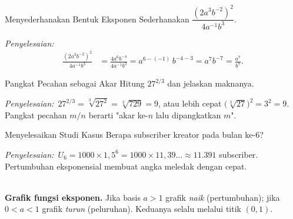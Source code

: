 \documentclass[11pt,a4paper]{report}
\theoremstyle{gaya}
\newcommand{\jawab}{\par\smallskip\noindent\textit{\textcolor{oranye}{Penyelesaian:}}\ }
\begin{document}
\begin{contoh}{Menyederhanakan Bentuk Eksponen}
Sederhanakan $\dfrac{(2a^3 b^{-2})^2}{4 a^{-1} b^3}$.

\jawab
\begin{align*}
\frac{(2a^3 b^{-2})^2}{4a^{-1}b^3}
&= \frac{4 a^6 b^{-4}}{4 a^{-1} b^3}
= a^{6-(-1)} \, b^{-4-3}
= a^{7} b^{-7} = \frac{a^7}{b^7}.
\end{align*}
\end{contoh}

\begin{contoh}{Pangkat Pecahan sebagai Akar}
Hitung $27^{2/3}$ dan jelaskan maknanya.

\jawab $27^{2/3}=\sqrt[3]{27^2}=\sqrt[3]{729}=9$, atau lebih cepat $\big(\sqrt[3]{27}\big)^2=3^2=9$. Pangkat pecahan $m/n$ berarti "akar ke-$n$ lalu dipangkatkan $m$".
\end{contoh}

\begin{contoh}{Menyelesaikan Studi Kasus}
Berapa subscriber kreator pada bulan ke-6?

\jawab $U_6=1000\times 1{,}5^6 = 1000 \times 11{,}39\ldots \approx 11.391$ subscriber. Pertumbuhan eksponensial membuat angka meledak dengan cepat.
\end{contoh}

\begin{center}
\\
\small \textbf{Grafik fungsi eksponen.} Jika basis $a>1$ grafik \emph{naik} (pertumbuhan);
jika $0<a<1$ grafik \emph{turun} (peluruhan). Keduanya selalu melalui titik $(0,1)$.
\end{center}
\end{document}
